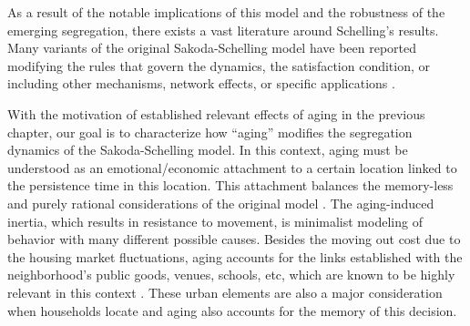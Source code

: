 As a result of the notable implications of this model and the robustness of the emerging segregation, there exists a vast literature around Schelling's results. Many variants of the original Sakoda-Schelling model have been reported modifying the rules that govern the dynamics, the satisfaction condition, or including other mechanisms, network effects, or specific applications \cite{Vinkovic,stauffer-2007,Dall_Asta_2008,gracia-lazaro-2009,Gauvin_2009,Gauvin_2010,domic-2011,henry-2011,unified,Interfacial_roughening,stauffer-2013,lenormand-2015,barmpalias-2018,jensen-2018,holden-2019,sert-2020,agarwal-2020,vieira-2020,ortega-2021,ortega-2021.2}.

With the motivation of established relevant effects of aging in the previous chapter, our goal is to characterize how ``aging'' modifies the segregation dynamics of the Sakoda-Schelling model. In this context, aging must be understood as an emotional/economic attachment to a certain location linked to the persistence time in this location. This attachment balances the memory-less and purely rational considerations of the original model \cite{granovetter-1985}. The aging-induced inertia, which results in resistance to movement, is minimalist modeling of behavior with many different possible causes. Besides the moving out cost due to the housing market fluctuations, aging accounts for the links established with the neighborhood’s public goods, venues, schools, etc, which are known to be highly relevant in this context \cite{wasserman-2001,chetty-2016,silver-2021}. These urban elements are also a major consideration when households locate \cite{denton1995persistence,clark-2002,clark-2003,silver2016scenescapes} and aging also accounts for the memory of this decision.


